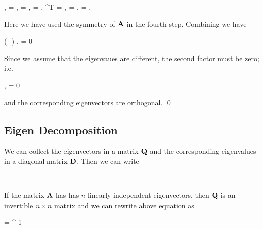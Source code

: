 \bee
\lambda \langle \xbf, \ybf \rangle = \langle \lambda \xbf, \ybf \rangle = \langle \Abf \xbf, \ybf \rangle = \langle \xbf , \Abf^T \ybf \rangle = \langle\xbf, \Abf\ybf\rangle = \langle\xbf, \mu \ybf\rangle = \mu \langle\xbf, \ybf\rangle
\eee

Here we have used the symmetry of $\mathbf{A}$ in the fourth step. Combining we have

\bee
(\lambda - \mu) \langle\xbf, \ybf \rangle = 0
\eee

Since we assume that the eigenvaues are different, the second factor must be zero; i.e.

\bee
\langle\xbf, \ybf\rangle = 0
\eee

and the corresponding eigenvectors are orthogonal. \qed


\subsection{Eigen Decomposition}

We can collect the eigenvectors in a matrix $\mathbf{Q}$ and the corresponding eigenvalues in a diagonal matrix $\mathbf{D}$. Then we can write

\bee
\Abf \Qbf = \Dbf \Qbf
\eee

If the matrix $\mathbf{A}$ has has $n$ linearly independent eigenvectors, then $\mathbf{Q}$ is an invertible $n \times n$ matrix and we can rewrite above equation as

\bee
\Abf = \Qbf \Dbf \Qbf^{-1}
\eee




